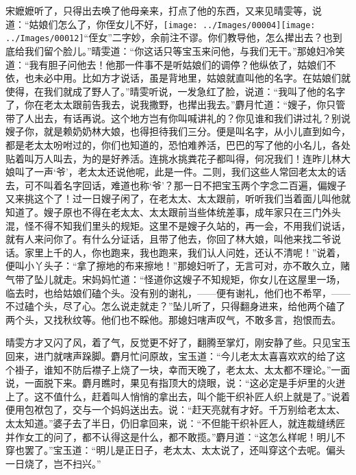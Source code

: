 宋嬷嬷听了，只得出去唤了他母亲来，打点了他的东西，又来见晴雯等，说道：``姑娘们怎么了，你侄女儿不好，{\texttt{[image: ../Images/00004]}\texttt{[image: ../Images/00012]}\footnotesize \kaishu ``侄女''二字妙，余前注不谬。}你们教导他，怎么撵出去？也到底给我们留个脸儿。''晴雯道：``你这话只等宝玉来问他，与我们无干。''那媳妇冷笑道：``我有胆子问他去！他那一件事不是听姑娘们的调停？他纵依了，姑娘们不依，也未必中用。比如方才说话，虽是背地里，姑娘就直叫他的名字。在姑娘们就使得，在我们就成了野人了。''晴雯听说，一发急红了脸，说道：``我叫了他的名字了，你在老太太跟前告我去，说我撒野，也撵出我去。''麝月忙道：``嫂子，你只管带了人出去，有话再说。这个地方岂有你叫喊讲礼的？你见谁和我们讲过礼？别说嫂子你，就是赖奶奶林大娘，也得担待我们三分。便是叫名字，从小儿直到如今，都是老太太吩咐过的，你们也知道的，恐怕难养活，巴巴的写了他的小名儿，各处贴着叫万人叫去，为的是好养活。连挑水挑粪花子都叫得，何况我们！连昨儿林大娘叫了一声`爷'，老太太还说他呢，此是一件。二则，我们这些人常回老太太的话去，可不叫着名字回话，难道也称`爷'？那一日不把宝玉两个字念二百遍，偏嫂子又来挑这个了！过一日嫂子闲了，在老太太、太太跟前，听听我们当着面儿叫他就知道了。嫂子原也不得在老太太、太太跟前当些体统差事，成年家只在三门外头混，怪不得不知我们里头的规矩。这里不是嫂子久站的，再一会，不用我们说话，就有人来问你了。有什么分证话，且带了他去，你回了林大娘，叫他来找二爷说话。家里上千的人，你也跑来，我也跑来，我们认人问姓，还认不清呢！''说着，便叫小丫头子：``拿了擦地的布来擦地！''那媳妇听了，无言可对，亦不敢久立，赌气带了坠儿就走。宋妈妈忙道：``怪道你这嫂子不知规矩，你女儿在这屋里一场，临去时，也给姑娘们磕个头。没有别的谢礼，------便有谢礼，他们也不希罕，------不过磕个头，尽了心。怎么说走就走？''坠儿听了，只得翻身进来，给他两个磕了两个头，又找秋纹等。他们也不睬他。那媳妇嗐声叹气，不敢多言，抱恨而去。

晴雯方才又闪了风，着了气，反觉更不好了，翻腾至掌灯，刚安静了些。只见宝玉回来，进门就嗐声跺脚。麝月忙问原故，宝玉道：``今儿老太太喜喜欢欢的给了这个褂子，谁知不防后襟子上烧了一块，幸而天晚了，老太太、太太都不理论。''一面说，一面脱下来。麝月瞧时，果见有指顶大的烧眼，说：``这必定是手炉里的火迸上了。这不值什么，赶着叫人悄悄的拿出去，叫个能干织补匠人织上就是了。''说着便用包袱包了，交与一个妈妈送出去。说：``赶天亮就有才好。千万别给老太太、太太知道。''婆子去了半日，仍旧拿回来，说：``不但能干织补匠人，就连裁缝绣匠并作女工的问了，都不认得这是什么，都不敢揽。''麝月道：``这怎么样呢！明儿不穿也罢了。''宝玉道：``明儿是正日子，老太太、太太说了，还叫穿这个去呢。偏头一日烧了，岂不扫兴。''

